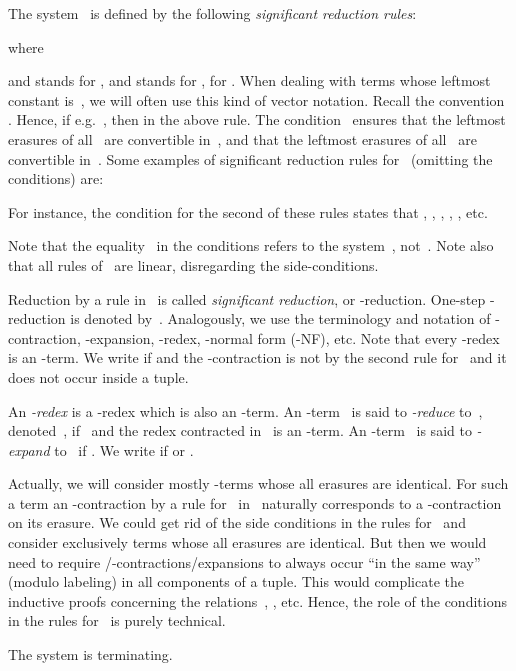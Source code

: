 \documentclass[a4paper,UKenglish]{lipics-v2016}
\begin{document}
\begin{definition}\label{def_clc_s}
  The system~ is defined by the following \emph{significant
    reduction rules}:
  
  
  where
  
  and  stands for , and  stands
  for , for . When dealing
  with terms whose leftmost constant is~, we
  will often use this kind of vector notation. Recall the convention
  . Hence, if e.g.~, then
   in the
  above rule. The condition~ ensures that the leftmost
  erasures of all~ are convertible in~, and that the
  leftmost erasures of all~ are convertible in~. Some
  examples of significant reduction rules for~
  (omitting the conditions) are:
  
  For instance, the condition for the second of these rules states
  that ,
  ,
  ,
  , , etc.

  Note that the equality~ in the conditions refers to the
  system~, not~. Note also that all rules of~ are
  linear, disregarding the side-conditions.

  Reduction by a rule in~ is called \emph{significant
    reduction}, or -reduction. One-step -reduction is denoted
  by~. Analogously, we use the terminology and notation of
  -contraction, -expansion, -redex, -normal form (-NF),
  etc. Note that every -redex is an -term. We write
   if  and the -contraction is not by
  the second rule for~ and it does not occur inside a tuple.

  An \emph{-redex} is a -redex which is also an -term. An
  -term~ is said to \emph{-reduce} to~,
  denoted~, if~ and the redex
  contracted in~ is an -term. An -term~ is said to
  \emph{-expand} to~ if . We write
   if  or .
\end{definition}

Actually, we will consider mostly -terms whose all erasures are
identical. For such a term an -contraction by a rule
for~ in~ naturally corresponds to a
-contraction on its erasure. We could get rid of the side
conditions in the rules for~ and consider exclusively
terms whose all erasures are identical. But then we would need to
require /-contractions/expansions to always occur ``in the same
way'' (modulo labeling) in all components of a tuple. This would
complicate the inductive proofs concerning the relations~,
, etc. Hence, the role of the conditions in the rules
for~ is purely technical.

\begin{lemma}\label{lem_sn}
  The system  is terminating.
\end{lemma}
\end{document}
